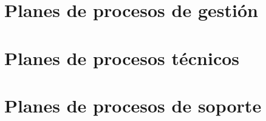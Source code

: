 \documentclass[a4paper,11pt,oneside]{report}
\begin{document}
\chapter{Planes de procesos de gestión}


\chapter{Planes de procesos técnicos}


\chapter{Planes de procesos de soporte}


% 
\end{document}
